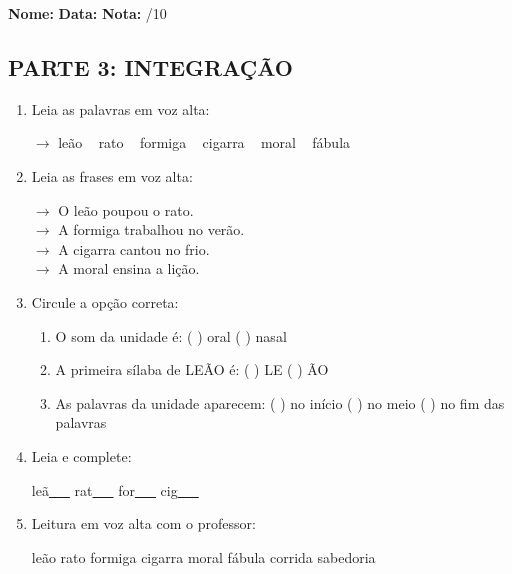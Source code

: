 \begin{exercicio}

\noindent\textbf{Nome:} \underline{\hspace{3.2cm}} \quad \textbf{Data:} \underline{\hspace{1.6cm}} \quad \textbf{Nota:} \underline{\hspace{0.9cm}}/10


\subsection*{PARTE 3: INTEGRAÇÃO}

\begin{enumerate}[resume]

  \item Leia as palavras em voz alta:
  \begin{center}
  $\rightarrow$ leão ~ rato ~ formiga ~ cigarra ~ moral ~ fábula
  \end{center}

  \item Leia as frases em voz alta:
  \begin{center}
  $\rightarrow$ O leão poupou o rato.\\
  $\rightarrow$ A formiga trabalhou no verão.\\
  $\rightarrow$ A cigarra cantou no frio.\\
  $\rightarrow$ A moral ensina a lição.\\
  \end{center}

  \item Circule a opção correta:
  \begin{enumerate}[label=(\alph*)]

    \item O som da unidade é: ( ) oral ( ) nasal 

    \item A primeira sílaba de LEÃO é: ( ) LE ( ) ÃO

    \item As palavras da unidade aparecem: ( ) no início ( ) no meio ( ) no fim das palavras

  \end{enumerate}

  \item Leia e complete:
  \begin{center}
  leã\underline{~~~} \quad rat\underline{~~~} \quad for\underline{~~~} \quad cig\underline{~~~}
  \end{center}

  \item Leitura em voz alta com o professor:
  \begin{center}
  leão \quad rato \quad formiga \quad cigarra \quad moral \quad fábula \quad corrida \quad sabedoria
  \end{center}

\end{enumerate}

\end{exercicio}

